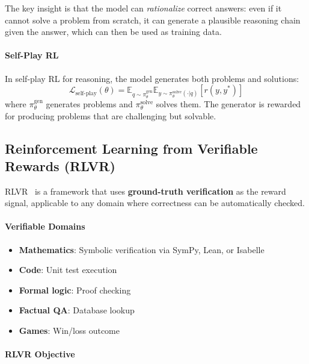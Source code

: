 The key insight is that the model can \emph{rationalize} correct answers: even if it cannot solve a problem from scratch, it can generate a plausible reasoning chain given the answer, which can then be used as training data.

\paragraph{Self-Play RL}
\label{self-play-rl}

In self-play RL for reasoning, the model generates both problems and solutions: 
\begin{equation}
    \mathcal{L}_{\text{self-play}}(\theta) = \mathbb{E}_{q \sim \pi_\theta^{\text{gen}}} \mathbb{E}_{y \sim \pi_\theta^{\text{solve}}(\cdot|q)} \left[ r(y, y^*) \right]
\end{equation}
 where $\pi_\theta^{\text{gen}}$ generates problems and $\pi_\theta^{\text{solve}}$ solves them. The generator is rewarded for producing problems that are challenging but solvable.

\subsection{Reinforcement Learning from Verifiable Rewards (RLVR)}
\label{subsubsec:rlvr}

RLVR~\cite{lambert2024tulu3} is a framework that uses \textbf{ground-truth verification} as the reward signal, applicable to any domain where correctness can be automatically checked.

\paragraph{Verifiable Domains}
\label{verifiable-domains}

\begin{itemize}
  \item \textbf{Mathematics}: Symbolic verification via SymPy, Lean, or Isabelle
  \item \textbf{Code}: Unit test execution
  \item \textbf{Formal logic}: Proof checking
  \item \textbf{Factual QA}: Database lookup
  \item \textbf{Games}: Win/loss outcome
\end{itemize}

\paragraph{RLVR Objective}
\label{rlvr-objective}

